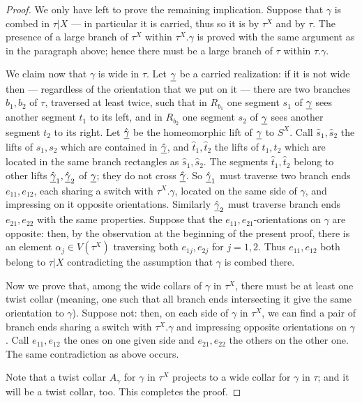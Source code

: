 \begin{proof}
We only have left to prove the remaining implication. Suppose that $\gamma$ is combed in $\tau|X$ --- in particular it is carried, thus so it is by $\tau^X$ and by $\tau$. The presence of a large branch of $\tau^X$ within $\tau^X.\gamma$ is proved with the same argument as in the paragraph above; hence there must be a large branch of $\tau$ within $\tau.\gamma$. 

We claim now that $\gamma$ is wide in $\tau$. Let $\underline{\gamma}$ be a carried realization: if it is not wide then --- regardless of the orientation that we put on it --- there are two branches $b_1,b_2$ of $\tau$, traversed at least twice, such that in $R_{b_1}$ one segment $s_1$ of $\underline{\gamma}$ sees another segment $t_1$ to its left, and in $R_{b_2}$ one segment $s_2$ of $\underline{\gamma}$ sees another segment $t_2$ to its right. Let $\underline{\hat\gamma}$ be the homeomorphic lift of $\underline{\gamma}$ to $S^X$. Call $\hat s_1,\hat s_2$ the lifts of $s_1,s_2$ which are contained in $\underline{\hat\gamma}$, and $\hat t_1,\hat t_2$ the lifts of $t_1,t_2$ which are located in the same branch rectangles as $\hat s_1,\hat s_2$. The segments $\hat t_1,\hat t_2$ belong to other lifts $\underline{\hat\gamma}_1,\underline{\hat\gamma}_2$ of $\underline{\gamma}$; they do not cross $\underline{\hat\gamma}$. So $\underline{\hat\gamma}_1$ must traverse two branch ends $e_{11},e_{12}$, each sharing a switch with $\tau^X.\gamma$, located on the same side of $\gamma$, and impressing on it opposite orientations. Similarly $\underline{\hat\gamma}_2$ must traverse branch ends $e_{21},e_{22}$ with the same properties. Suppose that the $e_{11},e_{21}$-orientations on $\gamma$ are opposite: then, by the observation at the beginning of the present proof, there is an element $\alpha_j\in V(\tau^X)$ traversing both $e_{1j},e_{2j}$ for $j=1,2$. Thus $e_{11},e_{12}$ both belong to $\tau|X$ contradicting the assumption that $\gamma$ is combed there.

Now we prove that, among the wide collars of $\gamma$ in $\tau^X$, there must be at least one twist collar (meaning, one such that all branch ends intersecting it give the same orientation to $\gamma$). Suppose not: then, on each side of $\gamma$ in $\tau^X$, we can find a pair of branch ends sharing a switch with $\tau^X.\gamma$ and impressing opposite orientations on $\gamma$. Call $e_{11},e_{12}$ the ones on one given side and $e_{21},e_{22}$ the others on the other one. The same contradiction as above occurs.

Note that a twist collar $A_\gamma$ for $\gamma$ in $\tau^X$ projects to a wide collar for $\gamma$ in $\tau$; and it will be a twist collar, too. This completes the proof.
\end{proof}

